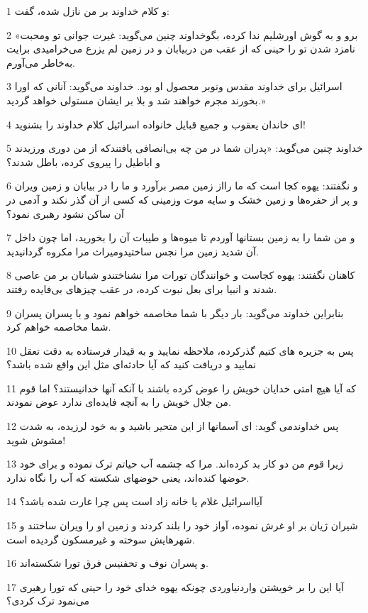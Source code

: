 \par 1 و کلام خداوند بر من نازل شده، گفت:
\par 2 «برو و به گوش اورشلیم ندا کرده، بگوخداوند چنین می‌گوید: غیرت جوانی تو ومحبت نامزد شدن تو را حینی که از عقب من دربیابان و در زمین لم یزرع می‌خرامیدی برایت به‌خاطر می‌آورم.
\par 3 اسرائیل برای خداوند مقدس ونوبر محصول او بود. خداوند می‌گوید: آنانی که اورا بخورند مجرم خواهند شد و بلا بر ایشان مستولی خواهد گردید.»
\par 4 ‌ای خاندان یعقوب و جمیع قبایل خانواده اسرائیل کلام خداوند را بشنوید!
\par 5 خداوند چنین می‌گوید: «پدران شما در من چه بی‌انصافی یافتندکه از من دوری ورزیدند و اباطیل را پیروی کرده، باطل شدند؟
\par 6 و نگفتند: یهوه کجا است که ما رااز زمین مصر برآورد و ما را در بیابان و زمین ویران و پر از حفره‌ها و زمین خشک و سایه موت وزمینی که کسی از آن گذر نکند و آدمی در آن ساکن نشود رهبری نمود؟
\par 7 و من شما را به زمین بستانها آوردم تا میوه‌ها و طیبات آن را بخورید، اما چون داخل آن شدید زمین مرا نجس ساختیدومیراث مرا مکروه گردانیدید.
\par 8 کاهنان نگفتند: یهوه کجاست و خوانندگان تورات مرا نشناختندو شبانان بر من عاصی شدند و انبیا برای بعل نبوت کرده، در عقب چیزهای بی‌فایده رفتند.
\par 9 بنابراین خداوند می‌گوید: بار دیگر با شما مخاصمه خواهم نمود و با پسران پسران شما مخاصمه خواهم کرد.
\par 10 پس به جزیره های کتیم گذرکرده، ملاحظه نمایید و به قیدار فرستاده به دقت تعقل نمایید و دریافت کنید که آیا حادثه‌ای مثل این واقع شده باشد؟
\par 11 که آیا هیچ امتی خدایان خویش را عوض کرده باشند با آنکه آنها خدانیستند؟ اما قوم من جلال خویش را به آنچه فایده‌ای ندارد عوض نمودند.
\par 12 پس خداوندمی گوید: ای آسمانها از این متحیر باشید و به خود لرزیده، به شدت مشوش شوید!
\par 13 زیرا قوم من دو کار بد کرده‌اند. مرا که چشمه آب حیاتم ترک نموده و برای خود حوضها کنده‌اند، یعنی حوضهای شکسته که آب را نگاه ندارد.
\par 14 آیااسرائیل غلام یا خانه زاد است پس چرا غارت شده باشد؟
\par 15 شیران ژیان بر او غرش نموده، آواز خود را بلند کردند و زمین او را ویران ساختند و شهرهایش سوخته و غیرمسکون گردیده است.
\par 16 و پسران نوف و تحفنیس فرق تورا شکسته‌اند.
\par 17 آیا این را بر خویشتن واردنیاوردی چونکه یهوه خدای خود را حینی که تورا رهبری می‌نمود ترک کردی؟
